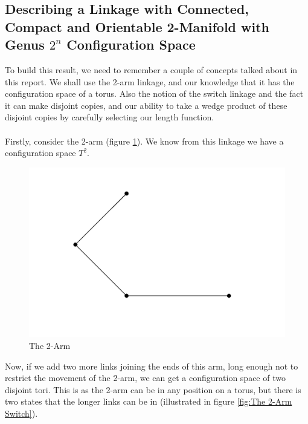 \documentclass{article}
\begin{document}
\subsection{Describing a Linkage with Connected, Compact and Orientable 2-Manifold with Genus $2^n$ Configuration Space}

To build this result, we need to remember a couple of concepts talked about in this report. We shall use the 2-arm linkage, and our knowledge that it has the configuration space of a torus. Also the notion of the switch linkage and the fact it can make disjoint copies, and our ability to take a wedge product of these disjoint copies by carefully selecting our length function. \\\\ Firstly, consider the 2-arm (figure \ref{fig:The 2-Arm figure 2}). We know from this linkage we have a configuration space $T^2$.

\begin{figure}[h!]
\centering
\includegraphics[scale=0.5]{./images/2-arm}
\caption{The 2-Arm}
\label{fig:The 2-Arm figure 2}
\end{figure}

\noindent Now, if we add two more links joining the ends of this arm, long enough not to restrict the movement of the 2-arm, we can get a configuration space of two disjoint tori. This is as the 2-arm can be in any position on a torus, but there is two states that the longer links can be in (illustrated in figure \ref{fig:The 2-Arm Switch}).
\end{document}
